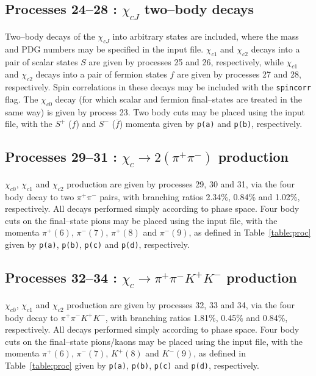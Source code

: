 \documentclass[12pt]{article}
\begin{document}
\subsection{Processes 24--28 : $\chi_{cJ}$ two--body decays}

Two--body decays of the $\chi_{cJ}$ into arbitrary states are included, where the mass and PDG numbers may be specified in the input file. $\chi_{c1}$ and $\chi_{c2}$ decays into a pair of scalar states $S$ are given by processes 25 and 26, respectively, while $\chi_{c1}$ and $\chi_{c2}$ decays into a pair of fermion states $f$ are given by processes 27 and 28, respectively. Spin correlations in these decays may be included with the \texttt{spincorr} flag.  The $\chi_{c0}$ decay (for which scalar and fermion final--states are treated in the same way) is given by process 23. Two body cuts may be placed using the input file, with the $S^+$ ($f$) and $S^-$ ($\overline{f}$) momenta given by \texttt{p(a)} and \texttt{p(b)}, respectively.

\subsection{Processes 29--31 : $\chi_c \to 2(\pi^+\pi^-)$ production}

$\chi_{c0}$, $\chi_{c1}$ and $\chi_{c2}$ production are given by processes 29, 30 and 31, via the four body decay to two $\pi^+\pi^-$ pairs, with branching ratios 2.34\%, 0.84\% and 1.02\%, respectively. All decays performed simply according to phase space. Four body cuts on the final--state pions may be placed using the input file, with the momenta $\pi^+(6)$, $\pi^-(7)$, $\pi^+(8)$ and $\pi^-(9)$, as defined in Table~\ref{table:proc} given by \texttt{p(a)}, \texttt{p(b)}, \texttt{p(c)} and \texttt{p(d)}, respectively.

\subsection{Processes 32--34 : $\chi_c \to \pi^+\pi^-K^+K^-$ production}

$\chi_{c0}$, $\chi_{c1}$ and $\chi_{c2}$ production are given by processes 32, 33 and 34, via the four body decay to $\pi^+\pi^-K^+K^-$, with branching ratios 1.81\%, 0.45\% and 0.84\%, respectively. All decays performed simply according to phase space. Four body cuts on the final--state pions/kaons may be placed using the input file, with the momenta $\pi^+(6)$, $\pi^-(7)$, $K^+(8)$ and $K^-(9)$, as defined in Table~\ref{table:proc} given by \texttt{p(a)}, \texttt{p(b)}, \texttt{p(c)} and \texttt{p(d)}, respectively.
\end{document}
